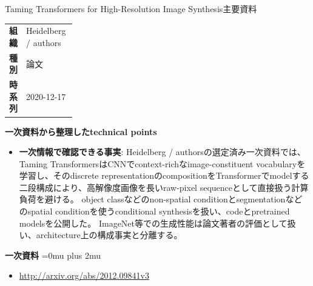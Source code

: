 \begin{technicalnote}{Taming Transformers for High-Resolution Image Synthesis}{主要資料}
\begingroup
\begin{tabularx}{\linewidth}{@{}>{\bfseries}p{0.22\linewidth}X@{}}
組織 & Heidelberg / authors \\
種別 & 論文 \\
時系列 & 2020-12-17 \\
\end{tabularx}
\smallskip
\begin{minipage}{\linewidth}
{\bfseries 一次資料から整理したtechnical points}
\begin{itemize}[leftmargin=1.5em,itemsep=0.35em]
\item \textbf{一次情報で確認できる事実}: Heidelberg / authorsの選定済み一次資料では、Taming TransformersはCNNでcontext-richなimage-constituent vocabularyを学習し、そのdiscrete representationのcompositionをTransformerでmodelする二段構成により、高解像度画像を長いraw-pixel sequenceとして直接扱う計算負荷を避ける。 object classなどのnon-spatial conditionとsegmentationなどのspatial conditionを使うconditional synthesisを扱い、codeとpretrained modelsを公開した。 ImageNet等での生成性能は論文著者の評価として扱い、architecture上の構成事実と分離する。
\end{itemize}
\begin{samepage}
{\bfseries 一次資料}
\begingroup\sloppy
\Urlmuskip=0mu plus 2mu\relax
\begin{itemize}[leftmargin=1.5em,itemsep=0.25em]
\item {\scriptsize\url{http://arxiv.org/abs/2012.09841v3}}
\end{itemize}
\endgroup
\end{samepage}
\end{minipage}
\endgroup
\end{technicalnote}
\medskip
